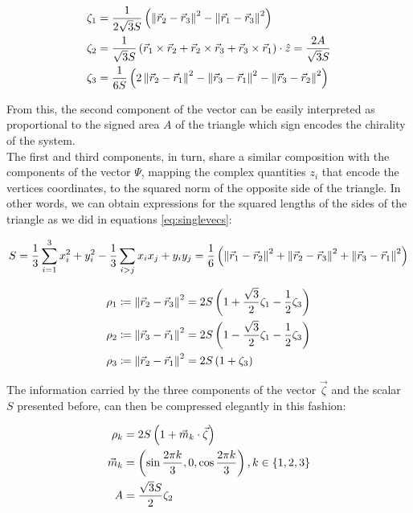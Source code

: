 \begin{align*}
\zeta_1 &= \frac{1}{2\sqrt{3}S}\left( \left\lVert \vec{r}_2 -\vec{r}_3 \right\rVert^2-\left\lVert \vec{r}_1 -\vec{r}_3 \right\rVert^2 \right)\\
\zeta_2 &= \frac{1}{\sqrt{3}S}\left( \vec{r}_1\times\vec{r}_2 + \vec{r}_2\times\vec{r}_3 +\vec{r}_3\times\vec{r}_1 \right)\cdot\hat{z} = \frac{2A}{\sqrt{3}S} \\
\zeta_3 &= \frac{1}{6S}\left( 2\left\lVert \vec{r}_2 -\vec{r}_1 \right\rVert^2-\left\lVert \vec{r}_3 -\vec{r}_1 \right\rVert^2-\left\lVert \vec{r}_3 -\vec{r}_2 \right\rVert^2 \right)\\
\end{align*}

From this, the second component of the vector can be easily interpreted as proportional to the signed area $A$ of the triangle which sign encodes the chirality of the system.\\

The first and third components, in turn, share a similar composition with the components of the vector $\Psi$, mapping the complex quantities $z_i$ that encode the vertices coordinates, to the squared norm of the opposite side of the triangle. In other words, we can obtain expressions for the squared lengths of the sides of the triangle as we did in equations \eqref{eq:singlevecs}:

\begin{align*}
S &= \frac{1}{3}\sum_{i=1}^3 x_i^2 + y_i^2 -\frac{1}{3}\sum_{i > j} x_ix_j + y_iy_j  = \frac{1}{6}\left( \left\lVert \vec{r}_1 -\vec{r}_2 \right\rVert^2+\left\lVert \vec{r}_2 -\vec{r}_3 \right\rVert^2+\left\lVert \vec{r}_3 -\vec{r}_1 \right\rVert^2 \right)\\
\end{align*}

\begin{equation}
\begin{aligned}
\rho_1 &\coloneqq \left\lVert \vec{r}_2 -\vec{r}_3 \right\rVert^2 = 2S\left( 1+\frac{\sqrt{3}}{2}\zeta_1-\frac{1}{2}\zeta_3 \right) \\
\rho_2 &\coloneqq \left\lVert \vec{r}_3 -\vec{r}_1 \right\rVert^2 = 2S\left( 1-\frac{\sqrt{3}}{2}\zeta_1-\frac{1}{2}\zeta_3 \right) \\
\rho_3 &\coloneqq \left\lVert \vec{r}_2 -\vec{r}_1 \right\rVert^2 = 2S\left( 1+\zeta_3 \right)
\end{aligned}
\label{eq:lados}
\end{equation}

The information carried by the three components of the vector $\vec{\zeta}$ and the scalar $S$ presented before, can then be compressed elegantly in this fashion:

\begin{equation}
\begin{aligned}
\rho_k &= 2S\left( 1+\vec{m}_k\cdot\vec{\zeta} \right)\\
\vec{m}_k &= \left( \sin{\frac{2\pi k}{3}},0,\cos{\frac{2\pi k}{3}} \right), k \in \left\lbrace 1,2, 3 \right\rbrace\\
A &= \frac{\sqrt{3}S}{2} \zeta_2
\end{aligned}
\label{eq:compressed}
\end{equation}

